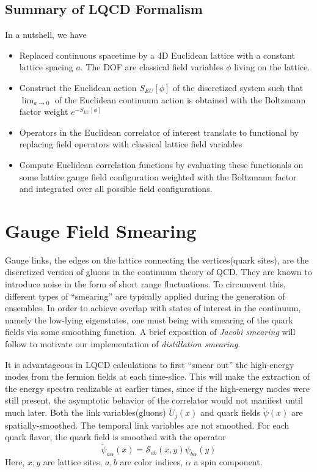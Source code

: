 \subsection{Summary of LQCD Formalism}
In a nutshell, we have 
\begin{itemize}
    \item Replaced continuous spacetime by a 4D Euclidean lattice with a constant lattice spacing $a$. The DOF are classical field variables $\phi$ living on the lattice.
    \item Construct the Euclidean action $S_{EU}[\phi]$ of the discretized system such that $\lim_{a \to 0}$ of the Euclidean continuum action is obtained with the Boltzmann factor weight $e^{-S_{EU}[\phi]}$ 
    \item Operators in the Euclidean correlator of interest translate to functional by replacing field operators with classical lattice field variables 
    \item Compute Euclidean correlation functions by evaluating these functionals on some lattice gauge field configuration weighted with the Boltzmann factor and integrated over all possible field configurations.
\end{itemize}

\section{Gauge Field Smearing}
Gauge links, the edges on the lattice connecting the vertices(quark sites), are the discretized version of gluons in the continuum theory of QCD. They are known to introduce noise in the form of short range fluctuations. To circumvent this, different types of ``smearing'' are typically applied during the generation of ensembles. In order to achieve overlap with states of interest in the continuum, namely the low-lying eigenstates, one must being with smearing of the quark fields via some smoothing function. A brief exposition of \textit{Jacobi smearing} will follow to motivate our implementation of \textit{distillation smearing}.

It is advantageous in LQCD calculations to first ``smear out'' the high-energy modes from the fermion fields at each time-slice. This will make the extraction of the energy spectra realizable at earlier times, since if the high-energy modes were still present, the asymptotic behavior of the correlator would not manifest until much later. 
Both the link variables(gluons) $\tilde{U}_j(x)$ and quark fields $\tilde{\psi}(x)$ are spatially-smoothed. The temporal link variables are not smoothed. For each quark flavor, the quark field is smoothed with the operator
\begin{equation}
    \tilde{\psi}_{a\alpha}(x) = \mathcal{S}_{ab}(x,y) \psi_{b\alpha}(y)
\end{equation}
Here, $x,y$ are lattice sites, $a,b$ are color indices, $\alpha$ a spin component. 

